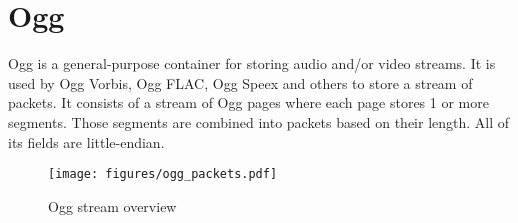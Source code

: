 
\chapter{Ogg}
\label{ogg}
Ogg is a general-purpose container for storing audio and/or video streams.
It is used by Ogg Vorbis, Ogg FLAC, Ogg Speex and others
to store a stream of packets.
It consists of a stream of Ogg pages where each page stores
1 or more segments.
Those segments are combined into packets based on their length.
All of its fields are little-endian.
\begin{figure}[h]
  \texttt{[image: figures/ogg\_packets.pdf]}
  \caption{Ogg stream overview}
\end{figure}

\clearpage

